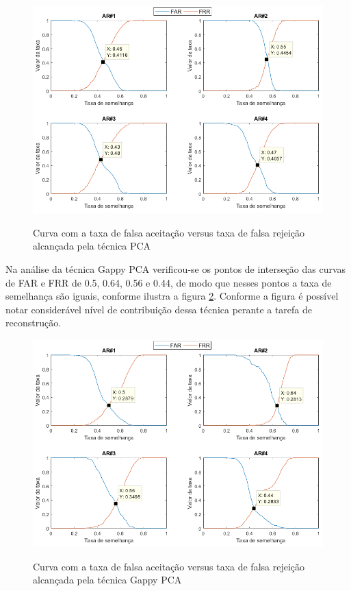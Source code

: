 \begin{figure}[H]
\centering
\caption{Curva com a taxa de falsa aceitação versus taxa de falsa rejeição alcançada pela técnica PCA}
\includegraphics[scale=0.55]{imgs4/graficos_FAR_FRR/PCA}
\label{fig:FAR_FRR_PCA}
\end{figure}


Na análise da técnica Gappy PCA verificou-se os pontos de interseção das curvas de FAR e FRR de 0.5, 0.64, 0.56 e 0.44, de modo que nesses pontos a taxa de semelhança são iguais, conforme ilustra a figura \ref{fig:FAR_FRR_GPCA}. Conforme a figura é possível notar considerável nível de contribuição dessa técnica perante a tarefa de reconstrução.


\begin{figure}[H]
\centering
\caption{Curva com a taxa de falsa aceitação versus taxa de falsa rejeição alcançada pela técnica Gappy PCA}
\includegraphics[scale=0.55]{imgs4/graficos_FAR_FRR/GPCA}
\label{fig:FAR_FRR_GPCA}
\end{figure}


